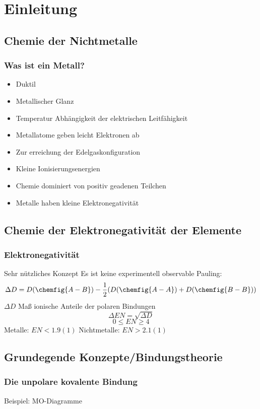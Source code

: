 \documentclass{article}
\begin{document}
\section{Einleitung}
\subsection{Chemie der Nichtmetalle}
\subsubsection{Was ist ein Metall?}
\begin{itemize}
\item Duktil
\item Metallischer Glanz
\item Temperatur Abhängigkeit der elektrischen Leitfähigkeit
\item Metallatome geben leicht Elektronen ab
\item Zur erreichung der Edelgaskonfiguration
\item Kleine Ionisierungsenergien
\item Chemie dominiert von positiv geadenen Teilchen
\item Metalle haben kleine Elektronegativität
\end{itemize}
\subsection{Chemie der Elektronegativität der Elemente}
\subsubsection{Elektronegativität}
Sehr nützliches Konzept
Es ist keine experimentell observable
Pauling:
\begin{equation*}
\Delta D = D(\chemfig{A-B}) - \frac{1}{2}(D(\chemfig{A-A}) + D(\chemfig{B-B}))
\end{equation*}
$\Delta D$ Maß ionische Anteile der polaren Bindungen
\begin{equation*}
\Delta EN = \sqrt{\Delta D}
\end{equation*}
\begin{equation*}
0 \leq EN \geq 4
\end{equation*}
Metalle: $EN < 1.9(1)$
Nichtmetalle: $EN > 2.1(1)$
\subsection{Grundegende Konzepte/Bindungstheorie}
\subsubsection{Die unpolare kovalente Bindung}
Beispiel: MO-Diagramme
\end{document}
